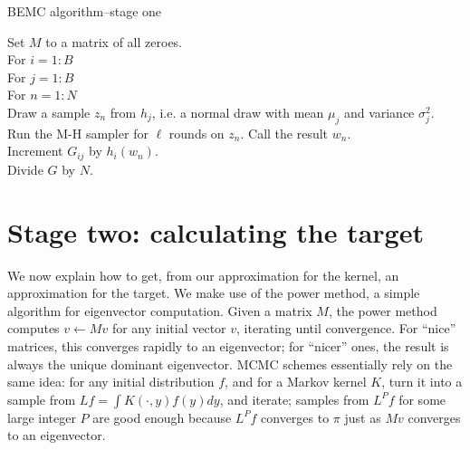 \documentclass{article}
\newcommand\EMK[1]{\textcolor{purple}{EMK: #1}}
\begin{document}
\begin{algorithm}[h]
\caption{BEMC algorithm--stage one}
Set $M$ to a matrix of all zeroes.\\
For $i  = 1:B$\\
\Indp
For $j  = 1:B$\\
\Indp
For $n = 1:N$\\
\Indp
Draw a sample $z_n$ from $h_{j}$, i.e. a normal draw with mean $\mu_j$ and variance $\sigma_j^2$.\\
Run the M-H sampler for $\ell$ rounds on $z_n$. Call the result $w_n$.\\
Increment $G_{ij}$ by $h_{i}(w_n)$.\\
\Indm
\Indm
\Indm
Divide $G$ by $N$.

\end{algorithm}

\section{Stage two: calculating the target}
\label{BEMC-target}
We now explain how to get, from our approximation for the kernel, an approximation for the target. We make use of the power method, a simple algorithm for eigenvector computation. Given a matrix $M$, the power method computes $v\leftarrow Mv$ for any initial vector $v$, iterating until convergence. For ``nice'' matrices, this converges rapidly to an eigenvector; for ``nicer'' ones, the result is always the unique dominant eigenvector. MCMC schemes essentially rely on the same idea: for any initial distribution $f$, and for a Markov kernel $K$, turn it into a sample from $Lf=\int K(\cdot, y)f(y)dy$, and iterate; samples from $L^Pf$ for some large integer $P$ are good enough because $L^Pf$ converges to $\pi$ just as $Mv$ converges to an eigenvector. 

%
%
\end{document}
